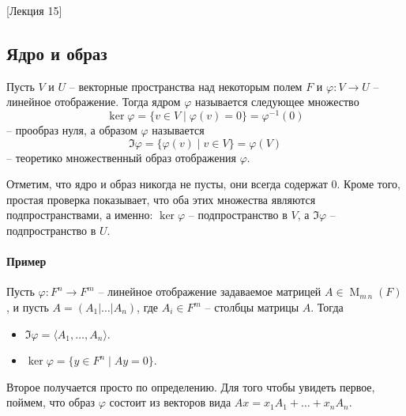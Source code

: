 [Лекция 15]


\subsection{Ядро и образ}

\begin{definition}
Пусть $V$ и $U$ -- векторные пространства над некоторым полем $F$ и $\varphi\colon V\to U$ -- линейное отображение.
Тогда ядром $\varphi$ называется следующее множество
\[
\ker \varphi = \{v\in V \mid \varphi(v) = 0\} = \varphi^{-1}(0)
\]
-- прообраз нуля, а образом $\varphi$ называется
\[
\Im \varphi = \{\varphi(v)\mid v\in V\} = \varphi(V)
\]
-- теоретико множественный образ отображения $\varphi$.
\end{definition}

Отметим, что ядро и образ никогда не пусты, они всегда содержат $0$.
Кроме того, простая проверка показывает, что оба этих множества являются подпространствами, а именно: $\ker\varphi$ -- подпространство в $V$, а $\Im \varphi $ -- подпространство в $U$.

\paragraph{Пример}

Пусть $\varphi \colon F^n\to F^m$ -- линейное отображение задаваемое матрицей $A\in\operatorname{M}_{m\,n}(F)$, и пусть $A = (A_1|\ldots|A_n)$, где $A_i\in F^m$ -- столбцы матрицы $A$.
Тогда
\begin{itemize}
\item $\Im \varphi = \langle A_1,\ldots,A_n\rangle$.

\item $\ker \varphi = \{y\in F^n\mid Ay = 0\}$.
\end{itemize}
Второе получается просто по определению.
Для того чтобы увидеть первое, поймем, что образ $\varphi$ состоит из векторов вида $Ax = x_1 A_1 + \ldots + x_n A_n$.


